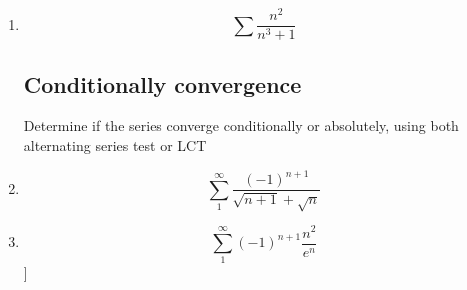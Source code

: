 \begin{enumerate}
    \item
    $$\sum \frac{n^2}{n^3+1}$$
    \vfill
    \newpage
 \subsection{Conditionally convergence}
 Determine if the series converge conditionally or absolutely, using both alternating series test or LCT
 \item $$\sum_1^\infty \frac{(-1)^{n+1}}{\sqrt{n+1}+\sqrt{n}}$$
\vfill
\item $$\sum_1^\infty (-1)^{n+1}\frac{n^2}{e^n}$$
]\vfill


\end{enumerate}
